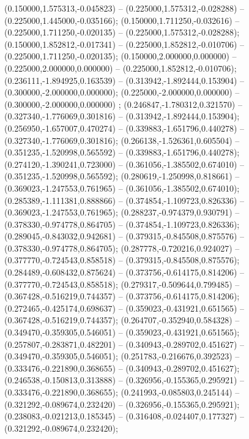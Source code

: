  (0.150000,1.575313,-0.045823) -- (0.225000,1.575312,-0.028288) -- (0.225000,1.445000,-0.035166);
 (0.150000,1.711250,-0.032616) -- (0.225000,1.711250,-0.020135) -- (0.225000,1.575312,-0.028288);
 (0.150000,1.852812,-0.017341) -- (0.225000,1.852812,-0.010706) -- (0.225000,1.711250,-0.020135);
 (0.150000,2.000000,0.000000) -- (0.225000,2.000000,0.000000) -- (0.225000,1.852812,-0.010706);
 (0.236111,-1.894925,0.163539) -- (0.313942,-1.892444,0.153904) -- (0.300000,-2.000000,0.000000);
 (0.225000,-2.000000,0.000000) -- (0.300000,-2.000000,0.000000) ;
 (0.246847,-1.780312,0.321570) -- (0.327340,-1.776069,0.301816) -- (0.313942,-1.892444,0.153904);
 (0.256950,-1.657007,0.470274) -- (0.339883,-1.651796,0.440278) -- (0.327340,-1.776069,0.301816);
 (0.266138,-1.526361,0.605504) -- (0.351235,-1.520998,0.565592) -- (0.339883,-1.651796,0.440278);
 (0.274120,-1.390241,0.723000) -- (0.361056,-1.385502,0.674010) -- (0.351235,-1.520998,0.565592);
 (0.280619,-1.250998,0.818661) -- (0.369023,-1.247553,0.761965) -- (0.361056,-1.385502,0.674010);
 (0.285389,-1.111381,0.888866) -- (0.374854,-1.109723,0.826336) -- (0.369023,-1.247553,0.761965);
 (0.288237,-0.974379,0.930791) -- (0.378330,-0.974778,0.864705) -- (0.374854,-1.109723,0.826336);
 (0.289045,-0.843032,0.942681) -- (0.379315,-0.845508,0.875576) -- (0.378330,-0.974778,0.864705);
 (0.287778,-0.720216,0.924027) -- (0.377770,-0.724543,0.858518) -- (0.379315,-0.845508,0.875576);
 (0.284489,-0.608432,0.875624) -- (0.373756,-0.614175,0.814206) -- (0.377770,-0.724543,0.858518);
 (0.279317,-0.509644,0.799485) -- (0.367428,-0.516219,0.744357) -- (0.373756,-0.614175,0.814206);
 (0.272465,-0.425174,0.698637) -- (0.359023,-0.431921,0.651565) -- (0.367428,-0.516219,0.744357);
 (0.264707,-0.352940,0.584328) -- (0.349470,-0.359305,0.546051) -- (0.359023,-0.431921,0.651565);
 (0.257807,-0.283871,0.482201) -- (0.340943,-0.289702,0.451627) -- (0.349470,-0.359305,0.546051);
 (0.251783,-0.216676,0.392523) -- (0.333476,-0.221890,0.368655) -- (0.340943,-0.289702,0.451627);
 (0.246538,-0.150813,0.313888) -- (0.326956,-0.155365,0.295921) -- (0.333476,-0.221890,0.368655);
 (0.241993,-0.085803,0.245144) -- (0.321292,-0.089674,0.232420) -- (0.326956,-0.155365,0.295921);
 (0.238083,-0.021213,0.185345) -- (0.316408,-0.024407,0.177327) -- (0.321292,-0.089674,0.232420);
